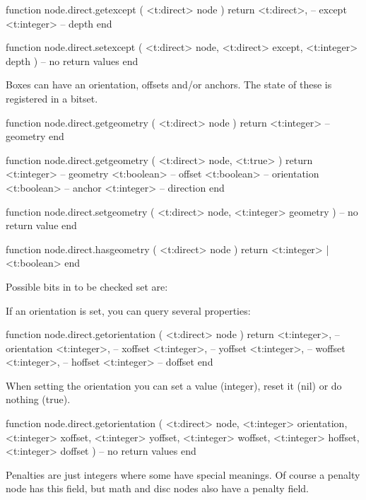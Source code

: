 \starttyping[option=LUA]
function node.direct.getexcept (
    <t:direct> node
)
    return
        <t:direct>, -- except
        <t:integer> -- depth
end

function node.direct.setexcept (
    <t:direct>  node,
    <t:direct>  except,
    <t:integer> depth
)
    -- no return values
end
\stoptyping

Boxes can have an orientation, offsets and/or anchors. The state of these is
registered in a  bitset.

\starttyping[option=LUA]
function node.direct.getgeometry (
    <t:direct> node
)
    return <t:integer> -- geometry
end

function node.direct.getgeometry (
    <t:direct> node,
    <t:true>
)
    return
        <t:integer> -- geometry
        <t:boolean> -- offset
        <t:boolean> -- orientation
        <t:boolean> -- anchor
        <t:integer> -- direction
end

function node.direct.setgeometry (
    <t:direct>  node,
    <t:integer> geometry
)
    -- no return value
end

function node.direct.hasgeometry (
    <t:direct> node
)
    return <t:integer> | <t:boolean>
end
\stoptyping

Possible bits in to be checked set are:


If an orientation is set, you can query several properties:

\starttyping[option=LUA]
function node.direct.getorientation (
    <t:direct> node
)
    return
        <t:integer>, -- orientation
        <t:integer>, -- xoffset
        <t:integer>, -- yoffset
        <t:integer>, -- woffset
        <t:integer>, -- hoffset
        <t:integer>  -- doffset
end
\stoptyping

When setting the orientation you can set a value (integer),
reset it (nil) or do nothing (true).

\starttyping[option=LUA]
function node.direct.getorientation (
    <t:direct>  node,
    <t:integer> orientation,
    <t:integer> xoffset,
    <t:integer> yoffset,
    <t:integer> woffset,
    <t:integer> hoffset,
    <t:integer> doffset
)
    -- no return values
end
\stoptyping

\stopsubsection

\startsubsection[title={Kerns, glue and penalties}]

Penalties are just integers where some have special meanings. Of course a penalty
node has this field, but math and disc nodes also have a penalty field.

